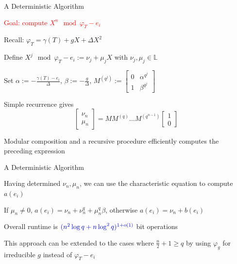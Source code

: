 \documentclass{beamer}
\newcommand{\blue}{\textcolor{blue}}
\newcommand{\red}{\textcolor{red}}
\begin{document}

\begin{frame}{A Deterministic Algorithm}

\item \red{Goal: compute $X^n \mod \varphi_{T} - e_i$}
\item Recall: $\varphi_T = \gamma(T) + gX + \Delta X^2$
    
    \item Define $X^j \mod \varphi_{T} - e_i := \nu_j + \mu_j X $ with $\nu_j, \mu_j \in \mathbb{L}$
    
    \item Set $\alpha := -\frac{\gamma(T) - e_i}{\Delta}$, $\beta := - \frac{g}{\Delta}$, $M^{(q^j)} := \begin{bmatrix} 0 & \alpha^{q^j} \\ 1 & \beta^{q^j} \end{bmatrix}$
    
    \item Simple recurrence gives 
    \[\begin{bmatrix} \nu_{n} \\ \mu_n  \end{bmatrix} = M M^{(q)} \ldots M^{(q^{n-1})}  \begin{bmatrix} 1 \\ 0  \end{bmatrix}\]
    
    \item Modular composition and a recursive procedure efficiently computes the preceding expression 

    
\end{frame}


\begin{frame}{A Deterministic Algorithm}

    \item Having determined $\nu_n, \mu_n$, we can use the characteristic equation to compute $a(e_i)$
        \item If $\mu_n \neq 0$, $a(e_i) = \nu_n + \nu_n^q + \mu_n^q \beta$, otherwise $a(e_i) = \nu_n + b(e_i)$
    \item Overall runtime is $\blue{(n^2 \log q + n \log^2 q)^{1+o(1)}}$ bit operations

    \item This approach can be extended to the cases where $\frac{n}{2} + 1 \geq q$ by using $\varphi_{g}$ for irreducible $g$ instead of $\varphi_T - e_i$

    
\end{frame}
\end{document}
